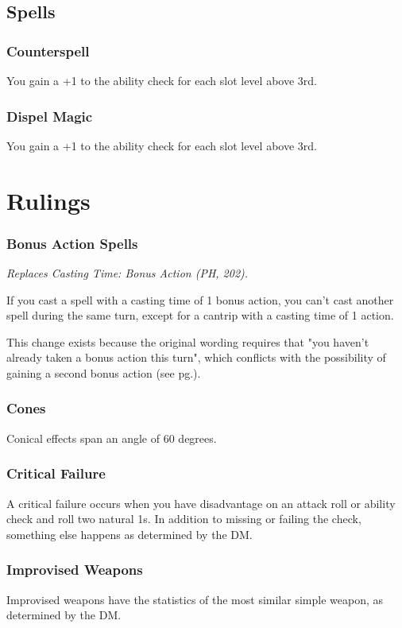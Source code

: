 \documentclass[letterpaper,twocolumn,openany,nodeprecatedcode]{dndbook}
\newcommand{\pg}[1]{pg.\pageref{#1}}
\begin{document}
\section{Spells}

\subsection{Counterspell}
You gain a +1 to the ability check for each slot level above 3rd.

\subsection{Dispel Magic}
You gain a +1 to the ability check for each slot level above 3rd.



\chapter{Rulings}

\subsection{Bonus Action Spells}
\textit{Replaces Casting Time: Bonus Action (PH, 202).}

If you cast a spell with a casting time of 1 bonus action, you can't cast another spell during the same turn, except for a cantrip with a casting time of 1 action.

This change exists because the original wording requires that "you haven't already taken a bonus action this turn", which conflicts with the possibility of gaining a second bonus action (see \pg{gameplay-bonus-action}).

\subsection{Cones}
Conical effects span an angle of 60 degrees.

\subsection{Critical Failure}
A critical failure occurs when you have disadvantage on an attack roll or ability check and roll two natural 1s. In addition to missing or failing the check, something else happens as determined by the DM. 

\subsection{Improvised Weapons}
Improvised weapons have the statistics of the most similar simple weapon, as determined by the DM.
\end{document}
